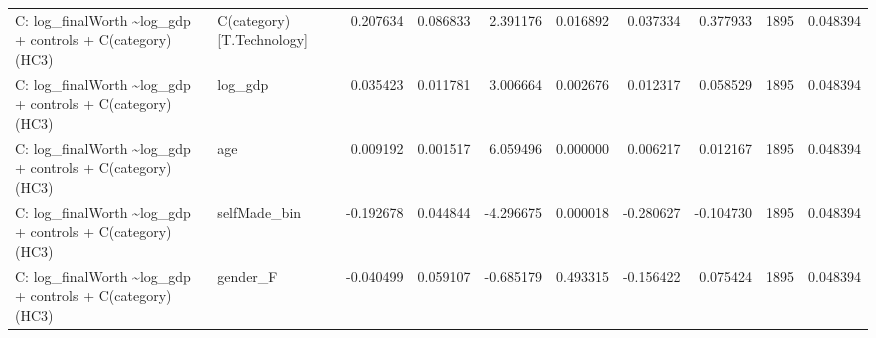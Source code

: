 \begin{tabular}{llrrrrrrrr}
C: log\_finalWorth \textasciitilde \space log\_gdp + controls + C(category) (HC3) & C(category)[T.Technology] & 0.207634 & 0.086833 & 2.391176 & 0.016892 & 0.037334 & 0.377933 & 1895 & 0.048394 \\
C: log\_finalWorth \textasciitilde \space log\_gdp + controls + C(category) (HC3) & log\_gdp & 0.035423 & 0.011781 & 3.006664 & 0.002676 & 0.012317 & 0.058529 & 1895 & 0.048394 \\
C: log\_finalWorth \textasciitilde \space log\_gdp + controls + C(category) (HC3) & age & 0.009192 & 0.001517 & 6.059496 & 0.000000 & 0.006217 & 0.012167 & 1895 & 0.048394 \\
C: log\_finalWorth \textasciitilde \space log\_gdp + controls + C(category) (HC3) & selfMade\_bin & -0.192678 & 0.044844 & -4.296675 & 0.000018 & -0.280627 & -0.104730 & 1895 & 0.048394 \\
C: log\_finalWorth \textasciitilde \space log\_gdp + controls + C(category) (HC3) & gender\_F & -0.040499 & 0.059107 & -0.685179 & 0.493315 & -0.156422 & 0.075424 & 1895 & 0.048394 \\
\bottomrule
\end{tabular}
